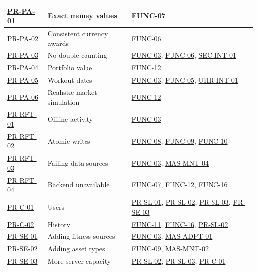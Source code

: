 \documentclass[12pt]{article}
\begin{document}
\begin{xltabular}{\textwidth}{|p{2.3cm}|p{4.2cm}|X|}
\hline
\hyperlink{req:PR-PA-01}{PR-PA-01} & Exact money values & \hyperlink{req:FUNC-07}{FUNC-07} \\
\hline
\hyperlink{req:PR-PA-02}{PR-PA-02} & Consistent currency awards & \hyperlink{req:FUNC-06}{FUNC-06} \\
\hline
\hyperlink{req:PR-PA-03}{PR-PA-03} & No double counting & \hyperlink{req:FUNC-03}{FUNC-03}, \hyperlink{req:FUNC-06}{FUNC-06}, \hyperlink{req:SEC-INT-01}{SEC-INT-01} \\
\hline
\hyperlink{req:PR-PA-04}{PR-PA-04} & Portfolio value & \hyperlink{req:FUNC-12}{FUNC-12} \\
\hline
\hyperlink{req:PR-PA-05}{PR-PA-05} & Workout dates & \hyperlink{req:FUNC-03}{FUNC-03}, \hyperlink{req:FUNC-05}{FUNC-05}, \hyperlink{req:UHR-INT-01}{UHR-INT-01} \\
\hline
\hyperlink{req:PR-PA-06}{PR-PA-06} & Realistic market simulation & \hyperlink{req:FUNC-12}{FUNC-12} \\
\hline
\hyperlink{req:PR-RFT-01}{PR-RFT-01} & Offline activity & \hyperlink{req:FUNC-03}{FUNC-03} \\
\hline
\hyperlink{req:PR-RFT-02}{PR-RFT-02} & Atomic writes & \hyperlink{req:FUNC-08}{FUNC-08}, \hyperlink{req:FUNC-09}{FUNC-09}, \hyperlink{req:FUNC-10}{FUNC-10} \\
\hline
\hyperlink{req:PR-RFT-03}{PR-RFT-03} & Failing data sources & \hyperlink{req:FUNC-03}{FUNC-03}, \hyperlink{req:MAS-MNT-04}{MAS-MNT-04} \\
\hline
\hyperlink{req:PR-RFT-04}{PR-RFT-04} & Backend unavailable & \hyperlink{req:FUNC-07}{FUNC-07}, \hyperlink{req:FUNC-12}{FUNC-12}, \hyperlink{req:FUNC-16}{FUNC-16} \\
\hline
\hyperlink{req:PR-C-01}{PR-C-01} & Users & \hyperlink{req:PR-SL-01}{PR-SL-01}, \hyperlink{req:PR-SL-02}{PR-SL-02}, \hyperlink{req:PR-SL-03}{PR-SL-03}, \hyperlink{req:PR-SE-03}{PR-SE-03} \\
\hline
\hyperlink{req:PR-C-02}{PR-C-02} & History & \hyperlink{req:FUNC-11}{FUNC-11}, \hyperlink{req:FUNC-16}{FUNC-16}, \hyperlink{req:PR-SL-02}{PR-SL-02} \\
\hline
\hyperlink{req:PR-SE-01}{PR-SE-01} & Adding fitness sources & \hyperlink{req:FUNC-03}{FUNC-03}, \hyperlink{req:MAS-ADPT-01}{MAS-ADPT-01} \\
\hline
\hyperlink{req:PR-SE-02}{PR-SE-02} & Adding asset types & \hyperlink{req:FUNC-09}{FUNC-09}, \hyperlink{req:MAS-MNT-02}{MAS-MNT-02} \\
\hline
\hyperlink{req:PR-SE-03}{PR-SE-03} & More server capacity & \hyperlink{req:PR-SL-02}{PR-SL-02}, \hyperlink{req:PR-SL-03}{PR-SL-03}, \hyperlink{req:PR-C-01}{PR-C-01} \\

\end{xltabular}
\end{document}
